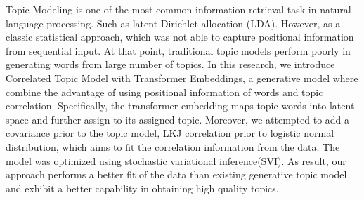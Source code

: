 Topic Modeling is one of the most common information retrieval task in
natural language processing. Such as latent Dirichlet allocation (LDA).
However, as a classic statistical approach, which was not able to
capture positional information from sequential input. At that point,
traditional topic models perform poorly in generating words from large
number of topics. In this research, we introduce Correlated Topic Model
with Transformer Embeddings, a generative model where combine the
advantage of using positional information of words and topic
correlation. Specifically, the transformer embedding maps topic words
into latent space and further assign to its assigned topic. Moreover, we
attempted to add a covariance prior to the topic model, LKJ correlation
prior to logistic normal distribution, which aims to fit the correlation
information from the data. The model was optimized using stochastic
variational inference(SVI). As result, our approach performs a better
fit of the data than existing generative topic model and exhibit a
better capability in obtaining high quality topics.